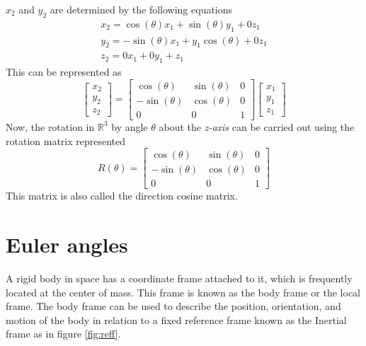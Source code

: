 $x_2$ and $y_2$ are determined by the following equations
\begin{equation}
\begin{gathered}
x_{2}=\cos (\theta) x_{1}+\sin (\theta) y_{1}+0 z_{1} \\
y_{2}=-\sin (\theta) x_{1}+y_{1} \cos (\theta)+0 z_{1} \\
z_{2}=0 x_{1}+0 y_{1}+z_{1}
\end{gathered}
\end{equation}
This can be represented as 
\begin{equation}
\left[\begin{array}{l}
x_{2} \\
y_{2} \\
z_{2}
\end{array}\right]=\left[\begin{array}{ccc}
\cos (\theta) & \sin (\theta) & 0 \\
-\sin (\theta) & \cos (\theta) & 0 \\
0 & 0 & 1
\end{array}\right]\left[\begin{array}{l}
x_{1} \\
y_{1} \\
z_{1}
\end{array}\right]
\end{equation}
Now, the rotation in $\mathbb{R}^3$  by angle $\theta$ about the \textit{z-axis} can be carried out using the rotation matrix represented
\begin{equation}
R(\theta)=\left[\begin{array}{ccc}
\cos (\theta) & \sin (\theta) & 0 \\
-\sin (\theta) & \cos (\theta) & 0 \\
0 & 0 & 1
\end{array}\right]
\end{equation}
This matrix is also called the direction cosine matrix.
\section{Euler angles}
A rigid body in space has a coordinate frame attached to it, which is frequently located at the center of mass. This frame is known as the body frame or the local frame. The body frame can be used to describe the position, orientation, and motion of the body in relation to a fixed reference frame known as the Inertial frame as in figure \ref{fig:reff}.

